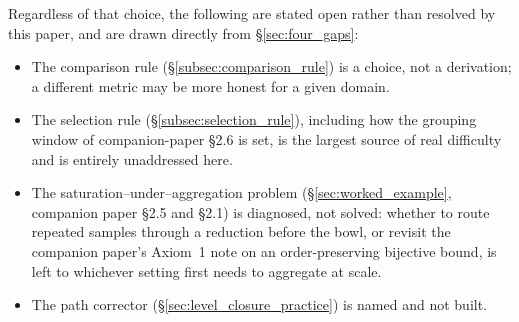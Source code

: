 \documentclass[12pt, a4paper]{article}
\begin{document}
Regardless of that choice, the following are stated open rather than
resolved by this paper, and are drawn directly from
\S\ref{sec:four_gaps}:

\begin{itemize}
\item The comparison rule (\S\ref{subsec:comparison_rule}) is a
      choice, not a derivation; a different metric may be more honest
      for a given domain.
\item The selection rule (\S\ref{subsec:selection_rule}), including
      how the grouping window of companion-paper \S2.6 is set, is the
      largest source of real difficulty and is entirely unaddressed
      here.
\item The saturation--under--aggregation problem
      (\S\ref{sec:worked_example}, companion paper \S2.5 and \S2.1) is
      diagnosed, not solved: whether to route repeated samples through
      a reduction before the bowl, or revisit the companion paper's
      Axiom~1 note on an order-preserving bijective bound, is left to
      whichever setting first needs to aggregate at scale.
\item The path corrector (\S\ref{sec:level_closure_practice}) is named
      and not built.
\end{itemize}
\end{document}
